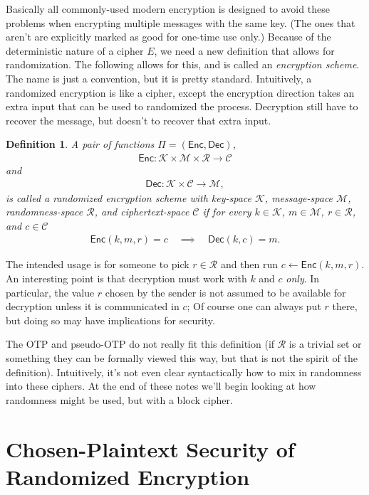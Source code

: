\documentclass[11pt]{article}
\newtheorem{definition}{Definition}
\newcommand{\msgs}{\mathcal{M}}
\newcommand{\ctxts}{\mathcal{C}}
\newcommand{\keys}{\mathcal{K}}
\newcommand{\rands}{\mathcal{R}}
\newcommand{\Enc}{\mathsf{Enc}}
\newcommand{\Dec}{\mathsf{Dec}}
\begin{document}
Basically all commonly-used modern encryption is designed to avoid these
problems when encrypting multiple messages with the same key. (The ones that
aren't are explicitly marked as good for one-time use only.) Because of the
deterministic nature of a cipher $E$, we need a new definition that allows for
randomization. The following allows for this, and is called an \emph{encryption
scheme}. The name is just a convention, but it is pretty standard. Intuitively,
a randomized encryption is like a cipher, except the encryption direction takes
an extra input that can be used to randomized the process. Decryption still
have to recover the message, but doesn't to recover that extra input.
\begin{definition}
    A pair of functions $\Pi=(\Enc,\Dec)$,
    \begin{align*}
        \Enc  : \keys\times\msgs\times\rands  \to  \ctxts 
    \end{align*}
    and
    \begin{align*}
        \Dec : \keys\times\ctxts \to \msgs,  
    \end{align*}
    is called a \emph{randomized encryption scheme with key-space $\keys$,
    message-space $\msgs$, randomness-space $\rands$, and ciphertext-space
    $\ctxts$} if for every $k\in\keys$, $m\in\msgs$, $r\in\rands$, and
    $c\in\ctxts$
    \begin{align*}
        \Enc(k,m,r)=c \quad \implies \quad \Dec(k,c)=m.
    \end{align*}
\end{definition}
The intended usage is for someone to pick $r\in\rands$ and then run
$c\gets\Enc(k,m,r)$. An interesting point is that decryption must work with $k$
and $c$ \emph{only}. In particular, the value $r$ chosen by the sender is not
assumed to be available for decryption unless it is communicated in $c$; Of
course one can always put $r$ there, but doing so may have implications for
security.

The OTP and pseudo-OTP do not really fit this definition (if $\rands$ is a
trivial set or something they can be formally viewed this way, but that is not
the spirit of the definition). Intuitively, it's not even clear syntactically
how to mix in randomness into these ciphers. At the end of these notes we'll
begin looking at how randomness might be used, but with a block cipher.

\section{Chosen-Plaintext Security of Randomized Encryption}
\end{document}
